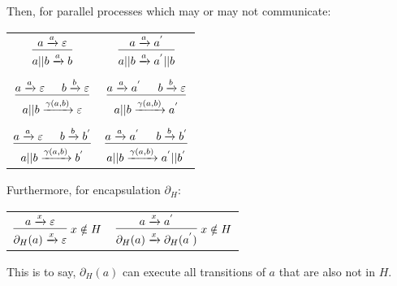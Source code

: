 \documentclass[99-notes-packed.tex]{subfiles}
\begin{document}
Then, for parallel processes which may or may not communicate: 
\begin{center}
    \begin{tabular}{cc}
        $
        \begin{prooftree}
            \hypo{a \xrightarrow{a} \varepsilon}
            \infer1{a || b \xrightarrow{a} b}
        \end{prooftree}
        $   &
        $
        \begin{prooftree}
            \hypo{a \xrightarrow{a} a^{'}}
            \infer1{a || b \xrightarrow{a} a^{'} || b}
        \end{prooftree}
        $   \\
        \\
        $
        \begin{prooftree}
            \hypo{a \xrightarrow{a} \varepsilon}
            \hypo{b \xrightarrow{b} \varepsilon}
            \infer2{a || b \xrightarrow{\gamma(a, b)} \varepsilon}
        \end{prooftree}
        $   &
        $
        \begin{prooftree}
            \hypo{a \xrightarrow{a} a^{'}}
            \hypo{b \xrightarrow{b} \varepsilon}
            \infer2{a || b \xrightarrow{\gamma(a, b)} a^{'}}
        \end{prooftree}
        $   \\
        \\
        $
        \begin{prooftree}
            \hypo{a \xrightarrow{a} \varepsilon}
            \hypo{b \xrightarrow{b} b^{'}}
            \infer2{a || b \xrightarrow{\gamma(a, b)} b^{'}}
        \end{prooftree}
        $   &
        $
        \begin{prooftree}
            \hypo{a \xrightarrow{a} a^{'}}
            \hypo{b \xrightarrow{b} b^{'}}
            \infer2{a || b \xrightarrow{\gamma(a, b)} a^{'} || b^{'}}
        \end{prooftree}
        $   \\
    \end{tabular}
\end{center}

Furthermore, for encapsulation ${\partial}_H$: 
\begin{center}
    \begin{tabular}{cc}
        $
        \begin{prooftree}
            \hypo{a \xrightarrow{x} \varepsilon}
            \infer1{\partial_H(a) \xrightarrow{x} \varepsilon}
        \end{prooftree}\ 
        x \notin H
        $   &
        $
        \begin{prooftree}
            \hypo{a \xrightarrow{x} a^{'}}
            \infer1{{\partial}_H(a) \xrightarrow{x} {\partial}_H(a^{'})}
        \end{prooftree}\ 
        x \notin H
        $   \\
    \end{tabular}
\end{center}
This is to say, $\partial_H(a)$ can execute all transitions of $a$ that are also not in $H$.
\end{document}
